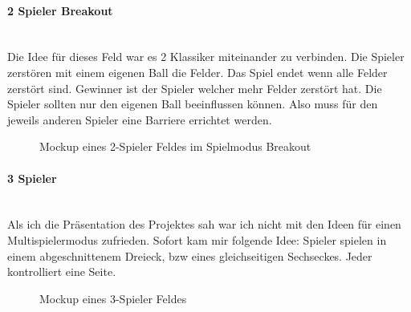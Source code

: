 \paragraph{2 Spieler Breakout}
\mbox{}\\
Die Idee für dieses Feld war es 2 Klassiker miteinander zu verbinden. Die Spieler zerstören mit einem eigenen Ball die Felder. Das Spiel endet wenn alle Felder zerstört sind. Gewinner ist der Spieler welcher mehr Felder zerstört hat.
\newline
Die Spieler sollten nur den eigenen Ball beeinflussen können. Also muss für den jeweils anderen Spieler eine Barriere errichtet werden.
\newline
\begin{figure}[ht]
	\begin{center}
	\end{center}
	\caption{Mockup eines 2-Spieler Feldes im Spielmodus Breakout}
	\label{figx}
\end{figure}
\newpage
\paragraph{3 Spieler}
\mbox{}\\
Als ich die Präsentation des Projektes sah war ich nicht mit den Ideen für einen Multispielermodus zufrieden. Sofort kam mir folgende Idee:
 Spieler spielen in einem abgeschnittenem Dreieck, bzw eines gleichseitigen Sechseckes. Jeder kontrolliert eine Seite.
\newline
\begin{figure}[ht]
	\begin{center}
	\end{center}
	\caption{Mockup eines 3-Spieler Feldes}
	\label{figx}
\end{figure}
\newline

